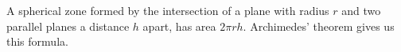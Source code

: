 A spherical zone formed by the intersection of a plane with radius $r$ and two
parallel planes a distance $h$ apart, has area $ 2 \pi rh$.
Archimedes' theorem gives us this formula.